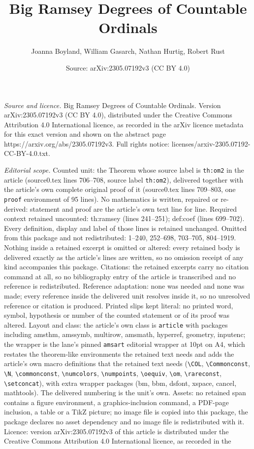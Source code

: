 \documentclass[10pt,a4paper]{amsart}
\title[Big Ramsey Degrees of Countable Ordinals]{Big Ramsey Degrees of Countable Ordinals}
\author{Joanna Boyland, William Gasarch, Nathan Hurtig, Robert Rust}
\date{Source: arXiv:2305.07192v3 (CC BY 4.0)}
\begin{document}
\maketitle

\noindent\emph{Source and licence.} Big Ramsey Degrees of Countable Ordinals. Version arXiv:2305.07192v3 (CC BY 4.0), distributed under the Creative Commons Attribution 4.0 International licence, as recorded in the arXiv licence metadata for this exact version and shown on the abstract page https://arxiv.org/abs/2305.07192v3. Full rights notice: licenses/arxiv-2305.07192-CC-BY-4.0.txt.\par\smallskip

\noindent\textit{Editorial scope.} Counted unit: the Theorem whose source label is \texttt{th:om2} in the article (source0.tex lines 706--708, source label \texttt{th:om2}), delivered together with the article's own complete original proof of it (source0.tex lines 709--803, one \texttt{proof} environment of 95 lines). No mathematics is written, repaired or re-derived: statement and proof are the article's own text line for line. Required context retained uncounted: th:ramsey (lines 241--251); def:coef (lines 699--702). Every definition, display and label of those lines is retained unchanged. Omitted from this package and not redistributed: 1--240, 252--698, 703--705, 804--1919. Nothing inside a retained excerpt is omitted or altered: every retained body is delivered exactly as the article's lines are written, so no omission receipt of any kind accompanies this package. Citations: the retained excerpts carry no citation command at all, so no bibliography entry of the article is transcribed and no reference is redistributed. Reference adaptation: none was needed and none was made; every reference inside the delivered unit resolves inside it, so no unresolved reference or citation is produced. Printed slips kept literal: no printed word, symbol, hypothesis or number of the counted statement or of its proof was altered. Layout and class: the article's own class is \texttt{article} with packages including amsthm, amssymb, multirow, amsmath, hyperref, geometry, inputenc; the wrapper is the lane's pinned \texttt{amsart} editorial wrapper at 10pt on A4, which restates the theorem-like environments the retained text needs and adds the article's own macro definitions that the retained text needs (\texttt{\textbackslash COL}, \texttt{\textbackslash Commonconst}, \texttt{\textbackslash N}, \texttt{\textbackslash commonconst}, \texttt{\textbackslash numcolors}, \texttt{\textbackslash numpoints}, \texttt{\textbackslash oequiv}, \texttt{\textbackslash om}, \texttt{\textbackslash rareconst}, \texttt{\textbackslash setconcat}), with extra wrapper packages (bm, bbm, dsfont, xspace, cancel, mathtools). The delivered numbering is the unit's own. Assets: no retained span contains a figure environment, a graphics-inclusion command, a PDF-page inclusion, a table or a TikZ picture; no image file is copied into this package, the package declares no asset dependency and no image file is redistributed with it. Licence: version arXiv:2305.07192v3 of this article is distributed under the Creative Commons Attribution 4.0 International licence, as recorded in the 
\end{document}
